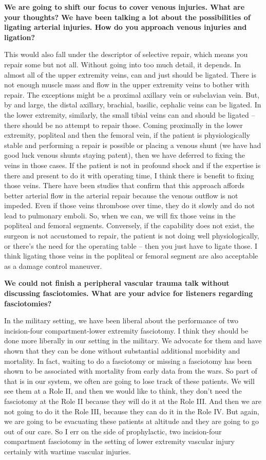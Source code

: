 \documentclass[
]{book}
\begin{document}
\textbf{We are going to shift our focus to cover venous injuries. What are
your thoughts? We have been talking a lot about the possibilities of
ligating arterial injuries. How do you approach venous injuries and
ligation?}

This would also fall under the descriptor of selective repair, which
means you repair some but not all. Without going into too much detail,
it depends. In almost all of the upper extremity veins, can and just
should be ligated. There is not enough muscle mass and flow in the upper
extremity veins to bother with repair. The exceptions might be a
proximal axillary vein or subclavian vein. But, by and large, the distal
axillary, brachial, basilic, cephalic veins can be ligated. In the lower
extremity, similarly, the small tibial veins can and should be ligated
-- there should be no attempt to repair those. Coming proximally in the
lower extremity, popliteal and then the femoral vein, if the patient is
physiologically stable and performing a repair is possible or placing a
venous shunt (we have had good luck venous shunts staying patent), then
we have deferred to fixing the veins in those cases. If the patient is
not in profound shock and if the expertise is there and present to do it
with operating time, I think there is benefit to fixing those veins.
There have been studies that confirm that this approach affords better
arterial flow in the arterial repair because the venous outflow is not
impeded.\citep{quan2008, clouse2007, rasmussen2022} Even if those veins
thrombose over time, they do it slowly and do not lead to pulmonary
emboli. So, when we can, we will fix those veins in the popliteal and
femoral segments. Conversely, if the capability does not exist, the
surgeon is not accustomed to repair, the patient is not doing well
physiologically, or there's the need for the operating table -- then you
just have to ligate those. I think ligating those veins in the popliteal
or femoral segment are also acceptable as a damage control maneuver.

\textbf{We could not finish a peripheral vascular trauma talk without
discussing fasciotomies. What are your advice for listeners regarding
fasciotomies?}

In the military setting, we have been liberal about the performance of
two incision-four compartment-lower extremity fasciotomy. I think they
should be done more liberally in our setting in the military. We
advocate for them and have shown that they can be done without
substantial additional morbidity and mortality. In fact, waiting to do a
fasciotomy or missing a fasciotomy has been shown to be associated with
mortality from early data from the wars. So part of that is in our
system, we often are going to lose track of these patients. We will see
them at a Role II, and then we would like to think, they don't need the
fasciotomy at the Role II because they will do it at the Role III. And
then we are not going to do it the Role III, because they can do it in
the Role IV. But again, we are going to be evacuating these patients at
altitude and they are going to go out of our care. So I err on the side
of prophylactic, two incision-four compartment fasciotomy in the setting
of lower extremity vascular injury certainly with wartime vascular
injuries.
\end{document}
